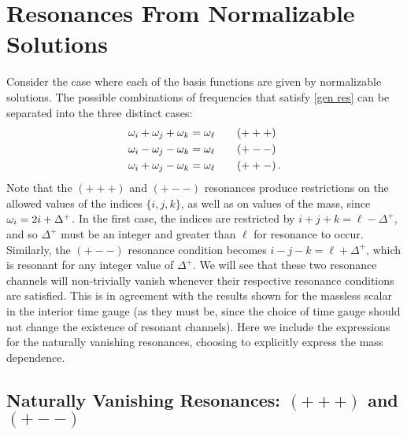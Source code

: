 \documentclass[../PhD.tex]{subfiles}
\begin{document}

\section{Resonances From Normalizable Solutions}
\label{sec: norm res}
Consider the case where each of the basis functions are given by normalizable solutions. The possible combinations of frequencies that satisfy \eqref{gen res} can be separated into the three distinct cases:
\begin{align}
\omega_i + \omega_j + \omega_k &= \omega_\ell \qquad (+++) \\
\omega_i - \omega_j - \omega_k &= \omega_\ell \qquad (+--) \\
\omega_i + \omega_j - \omega_k &= \omega_\ell \qquad (++-) \, .
\end{align}
Note that the $(+++)$ and $(+--)$ resonances produce restrictions on the allowed values of the indices $\{i, j, k\}$, as well as on values of the mass, since $\omega_i = 2 i + \Delta^+$. In the first case, the indices are restricted by ${i + j + k = \ell - \Delta^+}$, and so $\Delta^+$ must be an integer and greater than $\ell$ for resonance to occur. Similarly, the $(+--)$ resonance condition becomes ${i - j - k = \ell + \Delta^+}$, which is resonant for any integer value of $\Delta^+$. We will see that these two resonance channels will non-trivially vanish whenever their respective resonance conditions are satisfied. This is in agreement with the results shown for the massless scalar in the interior time gauge (as they must be, since the choice of time gauge should not change the existence of resonant channels). Here we include the expressions for the naturally vanishing resonances, choosing to explicitly express the mass dependence.


\subsection{Naturally Vanishing Resonances: $(+++)$ and $(+--)$}
\label{ssec: zero resonance}
\end{document}
